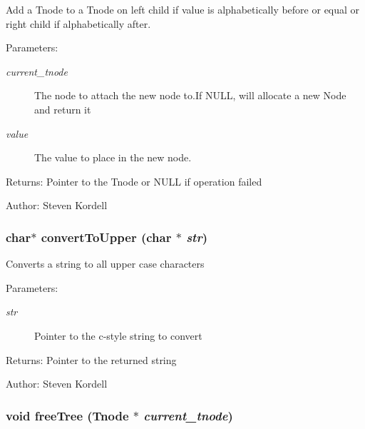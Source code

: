 Add a Tnode to a Tnode on left child if value is alphabetically before or equal or right child if alphabetically after. \begin{Desc}
\item[Parameters:]
\begin{description}
\item[{\em current\_\-tnode}]The node to attach the new node to.If NULL, will allocate a new Node and return it \item[{\em value}]The value to place in the new node. \end{description}
\end{Desc}
\begin{Desc}
\item[Returns:]Pointer to the Tnode or NULL if operation failed \end{Desc}
\begin{Desc}
\item[Author:]Steven Kordell \end{Desc}
\subsubsection{\setlength{\rightskip}{0pt plus 5cm}char$\ast$ convert\-To\-Upper (char $\ast$ {\em str})}\label{tree_8c_55598c5fb796fddbe31347850d78d707}


Converts a string to all upper case characters \begin{Desc}
\item[Parameters:]
\begin{description}
\item[{\em str}]Pointer to the c-style string to convert \end{description}
\end{Desc}
\begin{Desc}
\item[Returns:]Pointer to the returned string \end{Desc}
\begin{Desc}
\item[Author:]Steven Kordell \end{Desc}
\subsubsection{\setlength{\rightskip}{0pt plus 5cm}void free\-Tree (\bf{Tnode} $\ast$ {\em current\_\-tnode})}\label{tree_8c_db65a72a7751fd6dd3b6fe1683a50acf}


